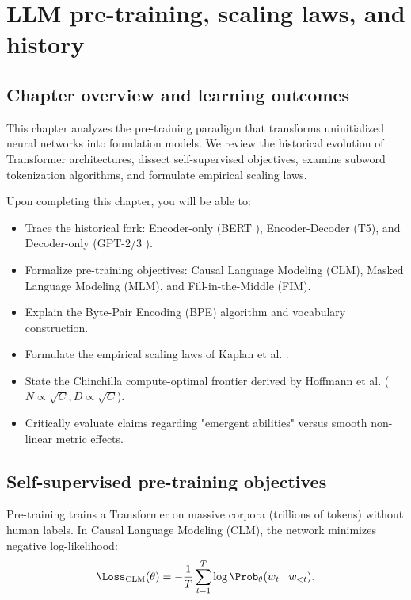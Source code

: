 \documentclass[../../main.tex]{subfiles}
\begin{document}
\chapter{LLM pre-training, scaling laws, and history}
\label{ch:scaling_laws_pretraining}

\section{Chapter overview and learning outcomes}
This chapter analyzes the pre-training paradigm that transforms uninitialized neural networks into foundation models. We review the historical evolution of Transformer architectures, dissect self-supervised objectives, examine subword tokenization algorithms, and formulate empirical scaling laws.

Upon completing this chapter, you will be able to:
\begin{itemize}
    \item Trace the historical fork: Encoder-only (BERT \citep{devlin2019}), Encoder-Decoder (T5), and Decoder-only (GPT-2/3 \citep{radford2019,brown2020}).
    \item Formalize pre-training objectives: Causal Language Modeling (CLM), Masked Language Modeling (MLM), and Fill-in-the-Middle (FIM).
    \item Explain the Byte-Pair Encoding (BPE) algorithm and vocabulary construction.
    \item Formulate the empirical scaling laws of Kaplan et al. \citep{kaplan2020}.
    \item State the Chinchilla compute-optimal frontier derived by Hoffmann et al. \citep{hoffmann2022} ($N \propto \sqrt{C}, D \propto \sqrt{C}$).
    \item Critically evaluate claims regarding "emergent abilities" versus smooth non-linear metric effects.
\end{itemize}

\section{Self-supervised pre-training objectives}
Pre-training trains a Transformer on massive corpora (trillions of tokens) without human labels. In Causal Language Modeling (CLM), the network minimizes negative log-likelihood:
\begin{equation}
\Loss_{\text{CLM}}(\theta) = -\frac{1}{T} \sum_{t=1}^T \log \Prob_\theta(w_t \mid w_{<t}).
\end{equation}
\end{document}
